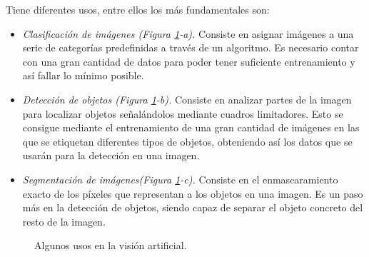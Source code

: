 Tiene diferentes usos, entre ellos los más fundamentales son:
\begin{itemize}
 \item \textit{Clasificación de imágenes (Figura \ref{fig:vision}-a).} Consiste en asignar imágenes a una serie de categorías predefinidas a través de un algoritmo. Es necesario contar con una gran cantidad de datos para poder tener suficiente entrenamiento y así fallar lo mínimo posible.
 \item \textit{Detección de objetos (Figura \ref{fig:vision}-b).} Consiste en analizar partes de la imagen para localizar objetos señalándolos mediante cuadros limitadores. Esto se consigue mediante el entrenamiento de una gran cantidad de imágenes en las que se etiquetan diferentes tipos de objetos, obteniendo así los datos que se usarán para la detección en una imagen.
  \item \textit{Segmentación de imágenes(Figura \ref{fig:vision}-c).} Consiste en el enmascaramiento exacto de los píxeles que representan a los objetos en una imagen. Es un paso más en la detección de objetos, siendo capaz de separar el objeto concreto del resto de la imagen. 
\end{itemize}
\begin{figure}[h!]
  \begin{center}
    \hspace{8mm}
    \hspace{8mm}
  \end{center}
\caption{Algunos usos en la visión artificial.} \label{fig:vision}
\end{figure}

